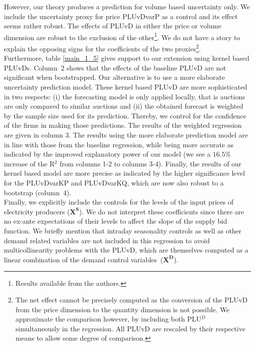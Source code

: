 However, our theory produces a prediction for volume based uncertainty only. We include the uncertainty proxy for price PLUvDvarP as a control and its effect seems rather robust. The effects of PLUvD in either the price or volume dimension are robust to the exclusion of the other\footnote{Results available from the authors.}. We do not have a story to explain the opposing signs for the coefficients of the two proxies\footnote{The net effect cannot be precisely computed as the conversion of the PLUvD from the price dimension to the quantity dimension is not possible. We approximate the comparison however, by including both PLU$^{D}$ simultaneously in the regression. All PLUvD are rescaled by their respective means to allow some degree of comparison.}. \\

Furthermore, table \ref{main_1_5} gives support to our extension using kernel based PLUvDs. Column~2 shows that the effects of the baseline PLUvD are not significant when bootstrapped. Our alternative is to use a more elaborate uncertainty prediction model.  These kernel based PLUvD are more sophisticated in two respects: (i) the forecasting model is only applied locally, that is auctions are only compared to similar auctions and (ii) the obtained forecast is weighted by the sample size used for its prediction. Thereby, we control for the confidence of the firms in making those predictions. The results of the weighted regression are given in column 3. The results using the more elaborate prediction model are
in line with those from the baseline regression, while being more accurate as indicated by the improved explanatory power of our model (we see a $16.5\%$ increase of the R$^2$ from columns 1-2 to columns 3-4). Finally, the results of our kernel based model are more precise as indicated by the higher significance level for the PLUvDvarKP and PLUvDvarKQ, which are now also robust to a bootstrap (column~4).\\




Finally, we explicitly include the controls for the levels of the input prices of electricity producers ($\boldsymbol{X^S}$). We do not interpret these coefficients since there are no ex-ante expectations of their levels to affect the slope of the supply bid function. We briefly mention that intraday seasonality controls as well as other demand related variables are not included in this regression to avoid multicollinearity problems with the PLUvD, which are themselves computed as a linear combination of the demand control variables~($\boldsymbol{X^D}$). \\

